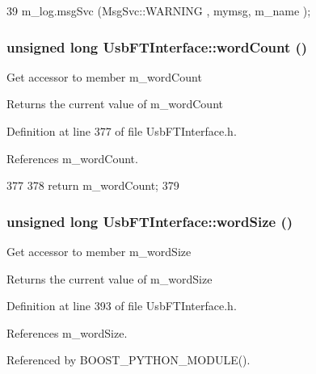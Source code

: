 \begin{DoxyCode}
39 { m_log.msgSvc (MsgSvc::WARNING , mymsg, m_name ); }
\end{DoxyCode}
\hypertarget{classUsbFTInterface_a2acaf55e8c253f20e1f25a023c9238f4}{
\subsubsection[{wordCount}]{\setlength{\rightskip}{0pt plus 5cm}unsigned long UsbFTInterface::wordCount ()}}
\label{classUsbFTInterface_a2acaf55e8c253f20e1f25a023c9238f4}
Get accessor to member m\_\-wordCount \begin{DoxyReturn}{Returns}
the current value of m\_\-wordCount 
\end{DoxyReturn}


Definition at line 377 of file UsbFTInterface.h.

References m\_\-wordCount.


\begin{DoxyCode}
377                              {
378     return m_wordCount;
379   }
\end{DoxyCode}
\hypertarget{classUsbFTInterface_add098ede127a2089e3ac8ea615ed6d46}{
\subsubsection[{wordSize}]{\setlength{\rightskip}{0pt plus 5cm}unsigned long UsbFTInterface::wordSize ()}}
\label{classUsbFTInterface_add098ede127a2089e3ac8ea615ed6d46}
Get accessor to member m\_\-wordSize \begin{DoxyReturn}{Returns}
the current value of m\_\-wordSize 
\end{DoxyReturn}


Definition at line 393 of file UsbFTInterface.h.

References m\_\-wordSize.

Referenced by BOOST\_\-PYTHON\_\-MODULE().


